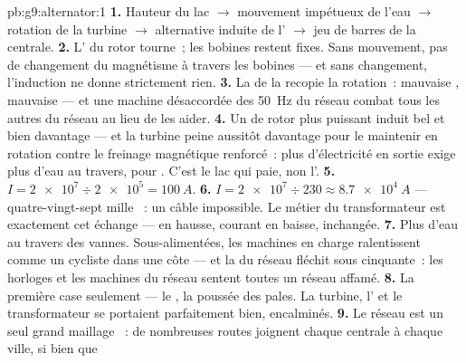 \begin{solution}{pb:g9:alternator:1}
\textbf{1.} Hauteur du lac $\to$ mouvement impétueux de l'eau $\to$
rotation de la turbine $\to$  alternative induite de
l' $\to$ jeu de barres de la centrale.
\textbf{2.} L' du rotor tourne~; les bobines restent fixes.
Sans mouvement, pas de changement du magnétisme à travers les
bobines --- et sans changement, l'induction ne donne strictement rien.
\textbf{3.} La  de la  recopie la rotation~: mauvaise
, mauvaise  --- et une machine désaccordée des
\qty{50}{Hz} du réseau combat tous les autres  du réseau
au lieu de les aider.
\textbf{4.} Un  de rotor plus puissant induit bel et bien
davantage --- et la turbine peine aussitôt davantage pour le maintenir
en rotation contre le freinage magnétique renforcé~: plus
d'électricité en sortie exige plus d'eau au travers,  pour .
C'est le lac qui paie, non l'.
\textbf{5.} $I = \num{2e7} \div \num{2e5} = \qty{100}{A}$.
\textbf{6.} $I = \num{2e7} \div 230 \approx \qty{8.7e4}{A}$ ---
quatre-vingt-sept mille ~: un câble impossible. Le métier du
transformateur est exactement cet échange ---  en hausse,
courant en baisse,  inchangée.
\textbf{7.} Plus d'eau au travers des vannes. Sous-alimentées, les
machines en charge ralentissent comme un cycliste dans une côte --- et
la  du réseau fléchit sous cinquante~: les horloges et les
machines du réseau sentent toutes un réseau affamé.
\textbf{8.} La première case seulement --- le , la poussée des
pales. La turbine, l' et le transformateur se portaient
parfaitement bien, encalminés.
\textbf{9.} Le réseau est un seul grand maillage ~: de
nombreuses routes joignent chaque centrale à chaque ville, si bien que

\end{solution}
